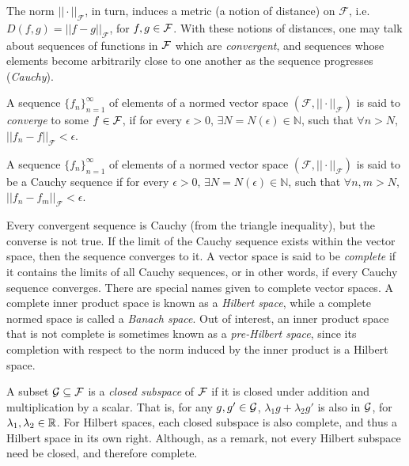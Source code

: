 The norm $||\cdot||_{\mathcal F}$, in turn, induces a metric (a notion of distance) on $\mathcal F$, i.e. $D(f,g) = ||f-g||_{\mathcal F}$, for $f,g\in{\mathcal F}$.
With these notions of distances, one may talk about sequences of functions in ${\mathcal F}$ which are \emph{convergent}, and sequences whose elements become arbitrarily close to one another as the sequence progresses (\emph{Cauchy}).

\begin{definition}
	A sequence $\{f_n\}_{n=1}^\infty$ of elements of a normed vector space $(\mathcal F, ||\cdot ||_{\mathcal F})$ is said to \emph{converge} to some $f\in{\mathcal F}$, if for every $\epsilon > 0$, $\exists N=N(\epsilon) \in \mathbb N$, such that $\forall n > N$, $||f_n - f||_{\mathcal F} < \epsilon$.
\end{definition}

\begin{definition}
	A sequence $\{f_n\}_{n=1}^\infty$ of elements of a normed vector space $(\mathcal F, ||\cdot ||_{\mathcal F})$ is said to be a Cauchy sequence if for every $\epsilon > 0$, $\exists N=N(\epsilon) \in \mathbb N$, such that $\forall n,m > N$, $||f_n - f_m||_{\mathcal F} < \epsilon$.
\end{definition}

Every convergent sequence is Cauchy (from the triangle inequality), but the converse is not true.
If the limit of the Cauchy sequence exists within the vector space, then the sequence converges to it.
A vector space is said to be \emph{complete} if it contains the limits of all Cauchy sequences, or in other words, if every Cauchy sequence converges.
There are special names given to complete vector spaces.
A complete inner product space is known as a \emph{Hilbert space}, while a complete normed space is called a \emph{Banach space}.
Out of interest, an inner product space that is not complete is sometimes known as a \emph{pre-Hilbert space}, since its completion with respect to the norm induced by the inner product is a Hilbert space.

A subset ${\mathcal G}\subseteq{\mathcal F}$ is a \emph{closed subspace} of ${\mathcal F}$ if it is closed under addition and multiplication by a scalar.
That is, for any $g,g'\in{\mathcal G}$, $\lambda_1 g + \lambda_2 g'$ is also in ${\mathcal G}$, for $\lambda_1,\lambda_2\in\mathbb{R}$.
For Hilbert spaces, each closed subspace is also complete, and thus a Hilbert space in its own right.
Although, as a remark, not every Hilbert subspace need be closed, and therefore complete. 


